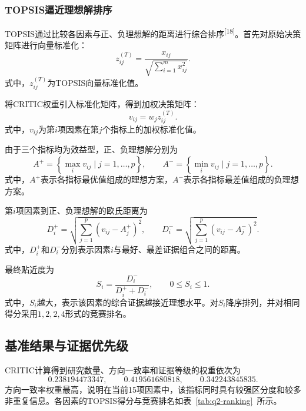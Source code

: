 \subsubsection{TOPSIS逼近理想解排序}

TOPSIS通过比较各因素与正、负理想解的距离进行综合排序\textsuperscript{[18]}。首先对原始决策矩阵进行向量标准化：
\begin{equation}
z_{ij}^{(T)}=
\frac{x_{ij}}{\sqrt{\sum_{i=1}^{m}x_{ij}^{2}}}.
\end{equation}
式中，$z_{ij}^{(T)}$为TOPSIS向量标准化值。

将CRITIC权重引入标准化矩阵，得到加权决策矩阵：
\begin{equation}
v_{ij}=w_j z_{ij}^{(T)}.
\end{equation}
式中，$v_{ij}$为第$i$项因素在第$j$个指标上的加权标准化值。

由于三个指标均为效益型，正、负理想解分别为
\begin{equation}
A^+=\left\{\max_i v_{ij}\mid j=1,\ldots,p\right\},
\qquad
A^-=\left\{\min_i v_{ij}\mid j=1,\ldots,p\right\}.
\end{equation}
式中，$A^+$表示各指标最优值组成的理想方案，$A^-$表示各指标最差值组成的负理想方案。

第$i$项因素到正、负理想解的欧氏距离为
\begin{equation}
D_i^+=\sqrt{\sum_{j=1}^{p}\left(v_{ij}-A_j^+\right)^2},
\qquad
D_i^-=\sqrt{\sum_{j=1}^{p}\left(v_{ij}-A_j^-\right)^2}.
\end{equation}
式中，$D_i^+$和$D_i^-$分别表示因素$i$与最好、最差证据组合之间的距离。

最终贴近度为
\begin{equation}
S_i=\frac{D_i^-}{D_i^++D_i^-},\qquad 0\leq S_i\leq 1.
\end{equation}
式中，$S_i$越大，表示该因素的综合证据越接近理想水平。对$S_i$降序排列，并对相同得分采用$1,2,2,4$形式的竞赛排名。

\subsection{基准结果与证据优先级}

CRITIC计算得到研究数量、方向一致率和证据等级的权重依次为
\[
0.238194473347,\qquad 0.419561680818,\qquad 0.342243845835.
\]
方向一致率权重最高，说明在当前15项因素中，该指标同时具有较强区分度和较多非重复信息。各因素的TOPSIS得分与竞赛排名如表~\ref{tab:q2-ranking}~所示。

